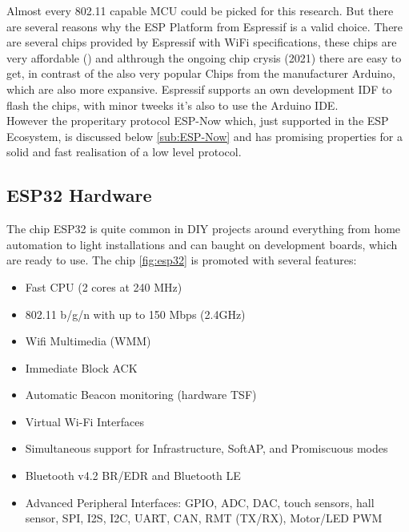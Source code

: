 Almost every 802.11 capable \ac{MCU} could be picked for this research.
But there are several reasons why the ESP Platform from Espressif is a valid choice.
There are several chips provided by Espressif with WiFi specifications, these chips are very affordable () 
and althrough the ongoing chip crysis (2021) there are easy to get, in contrast of the also very popular Chips from the manufacturer Arduino, which are also more expansive.
Espressif supports an own development IDF to flash the chips, with minor tweeks it's also to use the Arduino IDE.\\
However the properitary protocol ESP-Now which, just supported in the ESP Ecosystem, is discussed below \cref{sub:ESP-Now} 
and has promising properties for a solid and fast realisation of a low level protocol.

\subsection{ESP32 Hardware}

The chip ESP32 is quite common in DIY projects around everything from home automation to light installations 
and can baught on development boards, which are ready to use.
The chip \ref{fig:esp32} is promoted with several features: 
\begin{itemize}
	\setlength\itemsep{-0.0em}
	\item Fast CPU (2 cores at 240 MHz)
	\item 802.11 b/g/n with up to 150 Mbps (2.4GHz)
	\item Wifi Multimedia (WMM)
	\item Immediate Block ACK
	\item Automatic Beacon monitoring (hardware TSF)
	\item Virtual Wi-Fi Interfaces
	\item Simultaneous support for Infrastructure, SoftAP, and Promiscuous modes
	\item Bluetooth v4.2 BR/EDR and Bluetooth LE
	\item Advanced Peripheral Interfaces: GPIO, ADC, DAC, touch sensors, hall sensor, 
	SPI, I2S, I2C, UART, CAN, RMT (TX/RX), Motor/LED PWM 
\end{itemize}

